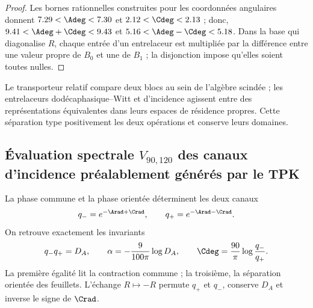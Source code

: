 \begin{proof}
Les bornes rationnelles construites pour les coordonnées angulaires donnent
\(7.29<\Adeg<7.30\) et \(2.12<\Cdeg<2.13\) ; donc,
\(9.41<\Adeg+\Cdeg<9.43\) et
\(5.16<\Adeg-\Cdeg<5.18\). Dans la base qui diagonalise \(R\), chaque entrée
d'un entrelaceur est multipliée par la différence entre une valeur propre
de \(B_0\) et une de \(B_1\) ; la disjonction impose qu'elles soient toutes nulles.
\end{proof}

Le transporteur relatif compare deux blocs au sein de l'algèbre scindée ;
les entrelaceurs dodécaphasique--Witt et d'incidence agissent entre des
représentations équivalentes dans leurs espaces de résidence propres. Cette séparation
type positivement les deux opérations et conserve leurs domaines.

\subsection{Évaluation spectrale \texorpdfstring{\(V_{90,120}\)}{V_90,120} des canaux d'incidence préalablement générés par le TPK}
\label{sec:s102:c38:6:3}


La phase commune et la phase orientée déterminent les deux canaux
\[
q_-=e^{-\Arad+\Crad},
\qquad
q_+=e^{-\Arad-\Crad}.
\]
On retrouve exactement les invariants
\[
q_-q_+=D_A,
\qquad
\alpha=-\frac9{100\pi}\log D_A,
\qquad
\Cdeg=\frac{90}{\pi}\log\frac{q_-}{q_+}.
\]
La première égalité lit la contraction commune ; la troisième, la séparation
orientée des feuillets. L'échange \(R\mapsto-R\) permute
\(q_+\) et \(q_-\), conserve \(D_A\) et inverse le signe de \(\Crad\).

\label{sec:l9s102:qpm-posteriores}

